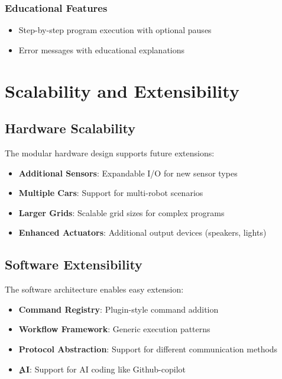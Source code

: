 \subsubsection{Educational Features}
\begin{itemize}
    \item Step-by-step program execution with optional pauses
    \item Error messages with educational explanations
\end{itemize}

\section{Scalability and Extensibility}

\subsection{Hardware Scalability}

The modular hardware design supports future extensions:

\begin{itemize}
    \item \textbf{Additional Sensors}: Expandable I/O for new sensor types
    \item \textbf{Multiple Cars}: Support for multi-robot scenarios
    \item \textbf{Larger Grids}: Scalable grid sizes for complex programs
    \item \textbf{Enhanced Actuators}: Additional output devices (speakers, lights)
\end{itemize}

\subsection{Software Extensibility}

The software architecture enables easy extension:

\begin{itemize}
    \item \textbf{Command Registry}: Plugin-style command addition
    \item \textbf{Workflow Framework}: Generic execution patterns
    \item \textbf{Protocol Abstraction}: Support for different communication methods
    \item \textbf{ِAI}: Support for AI coding like Github-copilot
\end{itemize}

